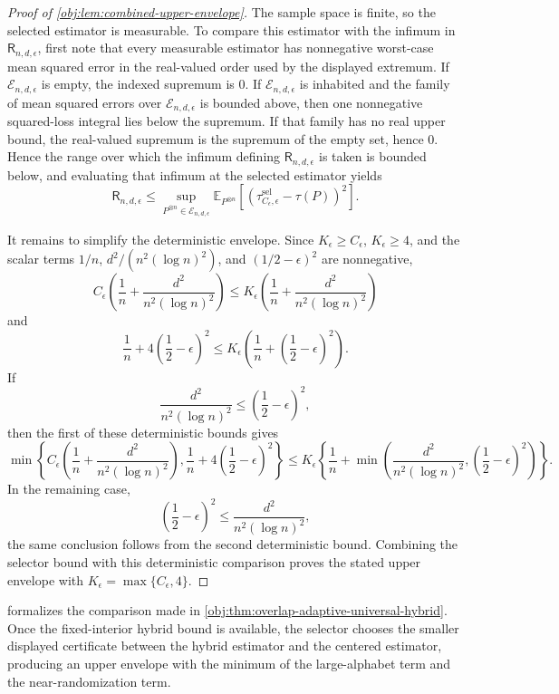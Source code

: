 \documentclass[11pt]{article}
\begin{document}
\begin{proof}[Proof of \cref{obj:lem:combined-upper-envelope}]
The sample space is finite, so the selected estimator is measurable. To compare this estimator with the infimum in \(\mathsf R_{n,d,\epsilon}\), first note that every measurable estimator has nonnegative worst-case mean squared error in the real-valued order used by the displayed extremum. If \(\mathcal E_{n,d,\epsilon}\) is empty, the indexed supremum is \(0\). If \(\mathcal E_{n,d,\epsilon}\) is inhabited and the family of mean squared errors over \(\mathcal E_{n,d,\epsilon}\) is bounded above, then one nonnegative squared-loss integral lies below the supremum. If that family has no real upper bound, the real-valued supremum is the supremum of the empty set, hence \(0\). Hence the range over which the infimum defining \(\mathsf R_{n,d,\epsilon}\) is taken is bounded below, and evaluating that infimum at the selected estimator yields
\[
\mathsf R_{n,d,\epsilon}
\le
\sup_{P^{\otimes n}\in\mathcal E_{n,d,\epsilon}}
\mathbb E_{P^{\otimes n}}\!\left[
(\widehat\tau^{\mathrm{sel}}_{C_\epsilon,\epsilon}-\tau(P))^2
\right]. %
\]

It remains to simplify the deterministic envelope. Since \(K_\epsilon\ge C_\epsilon\), \(K_\epsilon\ge4\), and the scalar terms \(1/n\), \(d^2/(n^2(\log n)^2)\), and \((1/2-\epsilon)^2\) are nonnegative,
\[
C_\epsilon\left(\frac1n+\frac{d^2}{n^2(\log n)^2}\right)
\le
K_\epsilon\left(\frac1n+\frac{d^2}{n^2(\log n)^2}\right)
\]
and
\[
\frac1n+4\left(\frac12-\epsilon\right)^2
\le
K_\epsilon\left(\frac1n+\left(\frac12-\epsilon\right)^2\right).
\]
If
\[
\frac{d^2}{n^2(\log n)^2}\le \left(\frac12-\epsilon\right)^2,
\]
then the first of these deterministic bounds gives
\[
\min\!\left\{
C_\epsilon\left(\frac1n+\frac{d^2}{n^2(\log n)^2}\right),
\frac1n+4\left(\frac12-\epsilon\right)^2
\right\}
\le
K_\epsilon\left\{\frac1n+\min\!\left(\frac{d^2}{n^2(\log n)^2},\left(\frac12-\epsilon\right)^2\right)\right\}.
\]
In the remaining case,
\[
\left(\frac12-\epsilon\right)^2\le \frac{d^2}{n^2(\log n)^2},
\]
the same conclusion follows from the second deterministic bound. Combining the selector bound with this deterministic comparison proves the stated upper envelope with \(K_\epsilon=\max\{C_\epsilon,4\}\). %
\end{proof}

 formalizes the comparison made in \cref{obj:thm:overlap-adaptive-universal-hybrid}. Once the fixed-interior hybrid bound is available, the selector chooses the smaller displayed certificate between the hybrid estimator and the centered estimator, producing an upper envelope with the minimum of the large-alphabet term and the near-randomization term.
\end{document}
